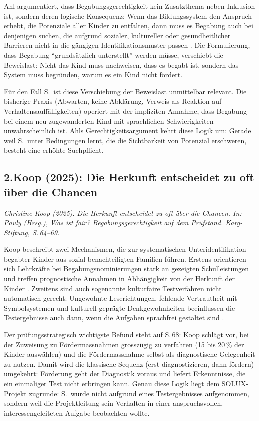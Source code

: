 \documentclass[ngerman, a4paper]{article}
\begin{document}
\medskip
Ahl argumentiert, dass Begabungsgerechtigkeit kein Zusatzthema neben Inklusion
ist, sondern deren logische Konsequenz: Wenn das Bildungssystem den Anspruch
erhebt, die Potenziale aller Kinder zu entfalten, dann muss es Begabung auch bei
denjenigen suchen, die aufgrund sozialer, kultureller oder gesundheitlicher
Barrieren nicht in die gängigen Identifikationsmuster passen
\parencite[S.\,8--9]{ahl2025begabungsgerechtigkeit}. Die Formulierung, dass
Begabung \enquote{grundsätzlich unterstellt} werden müsse, verschiebt die
Beweislast: Nicht das Kind muss nachweisen, dass es begabt ist, sondern das
System muss begründen, warum es ein Kind nicht fördert.

Für den Fall S.\ ist diese Verschiebung der Beweislast unmittelbar relevant. Die
bisherige Praxis (Abwarten, keine Abklärung, Verweis als Reaktion auf
Verhaltensauffälligkeiten) operiert mit der impliziten Annahme, dass Begabung
bei einem neu zugewanderten Kind mit sprachlichen Schwierigkeiten
unwahrscheinlich ist. Ahls Gerechtigkeitsargument kehrt diese Logik um: Gerade
weil S.\ unter Bedingungen lernt, die die Sichtbarkeit von Potenzial erschweren,
besteht eine erhöhte Suchpflicht.


\subsection*{2.\quad Koop (2025): Die Herkunft entscheidet zu oft über die Chancen}

\textit{Christine Koop (2025). Die Herkunft entscheidet zu oft über die Chancen.
In: Pauly (Hrsg.), Was ist fair? Begabungsgerechtigkeit auf dem Prüfstand.
Karg-Stiftung, S.\,64--69.}

\medskip
Koop beschreibt zwei Mechanismen, die zur systematischen Unteridentifikation
begabter Kinder aus sozial benachteiligten Familien führen. Erstens orientieren
sich Lehrkräfte bei Begabungsnominierungen stark an gezeigten Schulleistungen
und treffen prognostische Annahmen in Abhängigkeit von der Herkunft der Kinder
\parencite[S.\,66]{koop2025herkunft}. Zweitens sind auch sogenannte
kulturfaire Testverfahren nicht automatisch gerecht: Ungewohnte
Leserichtungen, fehlende Vertrautheit mit Symbolsystemen und kulturell
geprägte Denkgewohnheiten beeinflussen die Testergebnisse auch dann, wenn die
Aufgaben sprachfrei gestaltet sind \parencite[S.\,66]{koop2025herkunft}.

Der prüfungsstrategisch wichtigste Befund steht auf S.\,68: Koop schlägt vor,
bei der Zuweisung zu Fördermassnahmen grosszügig zu verfahren (15 bis 20\,\%
der Kinder auswählen) und die Fördermassnahme selbst als diagnostische
Gelegenheit zu nutzen. Damit wird die klassische Sequenz (erst diagnostizieren,
dann fördern) umgekehrt: Förderung geht der Diagnostik voraus und liefert
Erkenntnisse, die ein einmaliger Test nicht erbringen kann. Genau diese Logik
liegt dem SOLUX-Projekt zugrunde: S.\ wurde nicht aufgrund eines
Testergebnisses aufgenommen, sondern weil die Projektleitung sein Verhalten in
einer anspruchsvollen, interessengeleiteten Aufgabe beobachten wollte.
\end{document}
